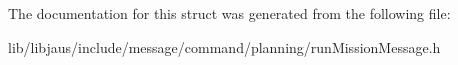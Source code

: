 

\-The documentation for this struct was generated from the following file\-:\begin{DoxyCompactItemize}
\item 
lib/libjaus/include/message/command/planning/run\-Mission\-Message.\-h\end{DoxyCompactItemize}
